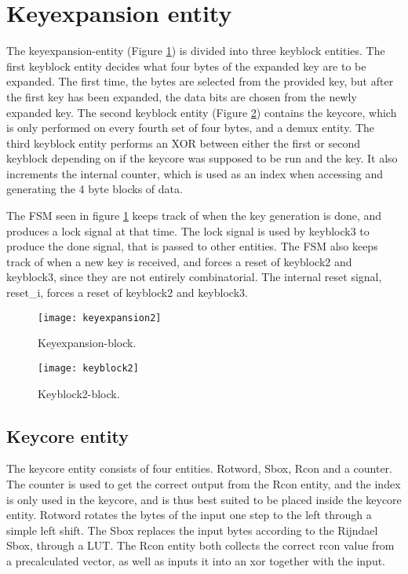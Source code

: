 \section{Keyexpansion entity} \label{sec:Expansion}
The keyexpansion-entity (Figure \ref{block:keyexpansion}) is divided 
into three keyblock entities. The first keyblock entity decides what 
four bytes of the expanded key are to be expanded. The first time, the 
bytes are selected from the provided key, but after the first key has 
been expanded, the data bits are chosen from the newly expanded key. 
The second keyblock entity (Figure \ref{block:keyblock2}) contains the 
keycore, which is only performed on every fourth set of four bytes, 
and a demux entity. The third keyblock entity performs an XOR between 
either the first or second keyblock depending on if the keycore was 
supposed to be run and the key. It also increments the internal 
counter, which is used as an index when accessing and generating the 4 
byte blocks of data.

The FSM seen in figure \ref{block:keyexpansion} keeps track of when 
the key generation is done, and produces a lock signal at that time. 
The lock signal is used by keyblock3 to produce the done signal, that 
is passed to other entities. 
The FSM also keeps track of when a new key is received, and forces a 
reset of keyblock2 and keyblock3, since they are not entirely 
combinatorial. The internal reset signal, reset\_i, forces a reset of 
keyblock2 and keyblock3. 

\begin{figure}
  \centering
  \texttt{[image: keyexpansion2]}
  \caption{Keyexpansion-block.}
  \label{block:keyexpansion}
\end{figure}

\begin{figure}
  \centering
  \texttt{[image: keyblock2]}
  \caption{Keyblock2-block.}
  \label{block:keyblock2}
\end{figure}

\subsection{Keycore entity}
The keycore entity consists of four entities. Rotword, Sbox, Rcon and 
a counter. The counter is used to get the correct output from the Rcon 
entity, and the index is only used in the keycore, and is thus best 
suited to be placed inside the keycore entity. Rotword rotates the 
bytes of the input one step to the left through a simple left shift. 
The Sbox replaces the input bytes according to the Rijndael Sbox, 
through a LUT. The Rcon entity both collects the correct rcon value 
from a precalculated vector, as well as inputs it into an xor together 
with the input.


